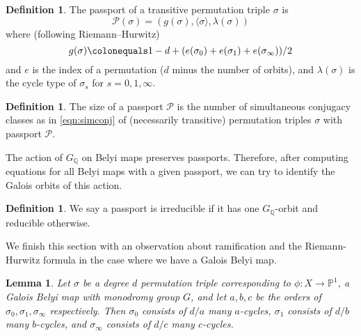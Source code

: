 \documentclass{dcthesis}
\newcommand{\PP}{\mathbb P}
\newcommand{\QQ}{\mathbb Q}
\newcommand{\defi}[1]{\textsf{#1}}
\numberwithin{equation}{section}
\newtheorem{lemma}[equation]{Lemma}
\theoremstyle{definition}
\newtheorem{definition}[equation]{Definition}
\theoremstyle{remark}
\begin{document}
{{{\begin{definition}
      \label{def:passportofpermutationtriple}
      The \defi{passport} of a transitive
      permutation triple $\sigma$ is
      \begin{equation}
        \label{eqn:passportofpermutationtriple}
        \mathcal{P}(\sigma)=
        (g(\sigma),\langle \sigma \rangle,
        \lambda(\sigma))
      \end{equation}
      where (following Riemann--Hurwitz)
      \begin{equation}
        \label{eqn:riemannhurwitzfortriples}
        g(\sigma) \colonequals
        1-d+(e(\sigma_0)+e(\sigma_1)+
        e(\sigma_\infty))/2
      \end{equation}
      and $e$ is the index of a
      permutation
      ($d$ minus the number of orbits), and
      $\lambda(\sigma)$ is the cycle
      type of $\sigma_s$ for $s=0,1,\infty$.
    \end{definition}
    \begin{definition}
      \label{def:passportsize}
      The
      \defi{size} of a passport $\mathcal{P}$
      is the number of simultaneous conjugacy
      classes as in \eqref{eqn:simconj} of
      (necessarily transitive) permutation
      triples $\sigma$ with passport $\mathcal{P}$.
    \end{definition}
    The action of $G_\QQ$ on
    Belyi maps preserves passports.
    Therefore, after computing equations
    for all Belyi maps with a given
    passport, we can try to
    identify the Galois orbits of this action.
    \begin{definition}
      \label{def:reduciblepassport}
      We say a passport is
      \defi{irreducible} if it has one
      $G_\QQ$-orbit and
      \defi{reducible} otherwise.
    \end{definition}
    We finish this section
    with an observation about ramification
    and the Riemann-Hurwitz formula
    in the case where we have a
    Galois Belyi map.
    \begin{lemma}\label{lem:regular}
      Let $\sigma$ be a degree $d$
      permutation triple corresponding to
      $\phi\colon X\to\PP^1$,
      a Galois Belyi map with monodromy group $G$,
      and let
      $a,b,c$ be the orders of
      $\sigma_0,\sigma_1,\sigma_\infty$
      respectively.
      Then
      $\sigma_0$
      consists of
      $d/a$
      many $a$-cycles,
      $\sigma_1$ consists of
      $d/b$ many $b$-cycles,
      and $\sigma_\infty$
      consists of $d/c$
      many $c$-cycles.

\end{lemma}}}}
\end{document}
